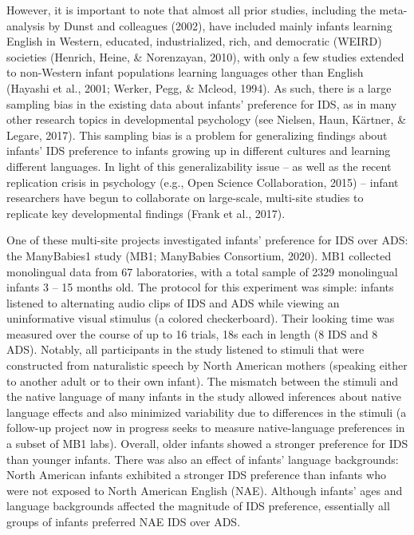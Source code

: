 \documentclass[
  ,man,floatsintext]{apa6}
\begin{document}
However, it is important to note that almost all prior studies, including the meta-analysis by Dunst and colleagues (2002), have included mainly infants learning English in Western, educated, industrialized, rich, and democratic (WEIRD) societies (Henrich, Heine, \& Norenzayan, 2010), with only a few studies extended to non-Western infant populations learning languages other than English (Hayashi et al., 2001; Werker, Pegg, \& Mcleod, 1994). As such, there is a large sampling bias in the existing data about infants' preference for IDS, as in many other research topics in developmental psychology (see Nielsen, Haun, Kärtner, \& Legare, 2017). This sampling bias is a problem for generalizing findings about infants' IDS preference to infants growing up in different cultures and learning different languages. In light of this generalizability issue -- as well as the recent replication crisis in psychology (e.g., Open Science Collaboration, 2015) -- infant researchers have begun to collaborate on large-scale, multi-site studies to replicate key developmental findings (Frank et al., 2017).

One of these multi-site projects investigated infants' preference for IDS over ADS: the ManyBabies1 study (MB1; ManyBabies Consortium, 2020). MB1 collected monolingual data from 67 laboratories, with a total sample of 2329 monolingual infants 3 -- 15 months old. The protocol for this experiment was simple: infants listened to alternating audio clips of IDS and ADS while viewing an uninformative visual stimulus (a colored checkerboard). Their looking time was measured over the course of up to 16 trials, 18s each in length (8 IDS and 8 ADS). Notably, all participants in the study listened to stimuli that were constructed from naturalistic speech by North American mothers (speaking either to another adult or to their own infant). The mismatch between the stimuli and the native language of many infants in the study allowed inferences about native language effects and also minimized variability due to differences in the stimuli (a follow-up project now in progress seeks to measure native-language preferences in a subset of MB1 labs). Overall, older infants showed a stronger preference for IDS than younger infants. There was also an effect of infants' language backgrounds: North American infants exhibited a stronger IDS preference than infants who were not exposed to North American English (NAE). Although infants' ages and language backgrounds affected the magnitude of IDS preference, essentially all groups of infants preferred NAE IDS over ADS.
\end{document}
